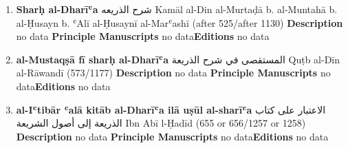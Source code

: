 \documentclass{article}
\begin{document}
\begin{enumerate}
      \item \textbf{Sharḥ al-Dharīʿa}
        \newline
        \textarabic{شرح الذريعه}
        \newline
        Kamāl al-Din al-Murtaḍā b. al-Muntahā b. al-Ḥusayn b. ʿAlī al-Ḥusaynī al-Marʿashī
        \newline
        (after 525/after 1130)
        \newline
        \newline
        \textbf{Description}
        \newline	
        no data
        \newline
        \newline
    \textbf{Principle Manuscripts}
\newline
no data\newline\textbf{Editions}
\newline
no data\newline
      \item \textbf{al-Mustaqṣā fī sharḥ al-Dharīʿa}
        \newline
        \textarabic{المستقصى في شرح الذريعة}
        \newline
        Quṭb al-Dīn al-Rāwandī
        \newline
        (573/1177)
        \newline
        \newline
        \textbf{Description}
        \newline	
        no data
        \newline
        \newline
    \textbf{Principle Manuscripts}
\newline
no data\newline\textbf{Editions}
\newline
no data\newline
      \item \textbf{al-Iʿtibār ʿalā kitāb al-Dharīʿa ilā uṣūl al-sharīʿa}
        \newline
        \textarabic{الاعتبار على كتاب الذريعة إلى أصول الشريعة}
        \newline
        Ibn Abī l-Ḥadīd
        \newline
        (655 or 656/1257 or 1258)
        \newline
        \newline
        \textbf{Description}
        \newline	
        no data
        \newline
        \newline
    \textbf{Principle Manuscripts}
\newline
no data\newline\textbf{Editions}
\newline
no data\newline
            \end{enumerate}
\end{document}
